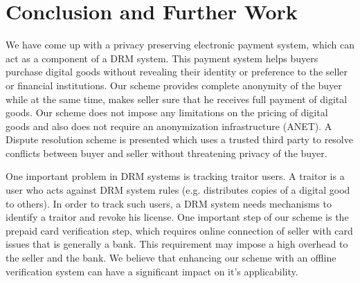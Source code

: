 \documentclass[times]{secauth}
\begin{document}
\section{Conclusion and Further Work}
\label{sec:conclusion}
We have come up with a privacy preserving electronic payment system, which can act as a component of a DRM system. This payment system helps buyers purchase digital goods without revealing their identity or preference to the seller or financial institutions. Our scheme provides complete anonymity of the buyer while at the same time, makes seller sure that he receives full payment of digital goods. Our scheme does not impose any limitations on the pricing of digital goods and also does not require an anonymization infrastructure (ANET). A Dispute resolution scheme is presented which uses a trusted third party to resolve conflicts between buyer and seller without threatening privacy of the buyer.
\par One important problem in DRM systems is tracking traitor users. A traitor is a user who acts against DRM system rules (e.g. distributes copies of a digital good to others). In order to track such users, a DRM system needs mechanisms to identify a traitor and revoke his license. 
One important step of our scheme is the prepaid card verification step, which requires online connection of seller with card issues that is generally a bank. This requirement may impose a high overhead to the seller and the bank. We believe that enhancing our scheme with an offline verification system can have a significant impact on it's applicability.




\end{document}
